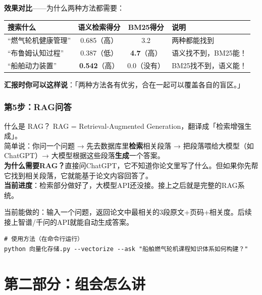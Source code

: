 \documentclass[12pt,a4paper,landscape]{article}
\begin{document}
\textbf{效果对比}——为什么两种方法都需要：

\begin{center}
\begin{tabular}{lccl}
\toprule
\textbf{搜索什么} & \textbf{语义检索得分} & \textbf{BM25得分} & \textbf{说明} \\
\midrule
``燃气轮机健康管理'' & 0.685（高） & 3.2 & 两种都能找到 \\
``布鲁姆认知过程'' & 0.387（低） & \textbf{4.7}（高） & 语义找不到，BM25能！ \\
``船舶动力装置'' & \textbf{0.542}（高） & 0.0（没有） & BM25找不到，语义能！ \\
\bottomrule
\end{tabular}
\end{center}

\textbf{汇报时你可以这样说}：「两种方法各有优劣，合在一起可以覆盖各自的盲区。」

\section{第5步：RAG问答}

\begin{termbox}{什么是 RAG？}
RAG = Retrieval-Augmented Generation，翻译成「检索增强生成」。\\[2pt]
简单说：你问一个问题 → 先去数据库里\textbf{检索}相关段落 → 把段落喂给大模型（如ChatGPT）→ 大模型根据这些段落\textbf{生成}一个答案。\\[2pt]
\textbf{为什么需要RAG？}直接问ChatGPT，它不知道你论文里写了什么。但如果你先帮它找到相关段落，它就能基于论文内容回答了。\\[2pt]
\textbf{当前进度}：检索部分做好了，大模型API还没接。接上之后就是完整的RAG系统。
\end{termbox}

当前能做的：输入一个问题，返回论文中最相关的3段原文+页码+相关度。后续接上智谱/千问的API就能自动生成答案。

\begin{lstlisting}
# 使用方法（在命令行运行）
python 向量化存储.py --vectorize --ask "船舶燃气轮机课程知识体系如何构建？"
\end{lstlisting}


\part*{第二部分：组会怎么讲}
\end{document}
